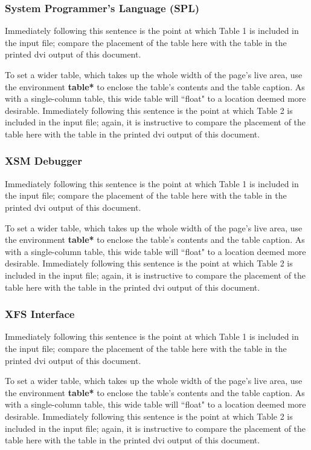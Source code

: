 \documentclass{sig-alternate}
\begin{document}
\subsubsection{System Programmer's Language (SPL)}
Immediately following this sentence is the point at which
Table 1 is included in the input file; compare the
placement of the table here with the table in the printed
dvi output of this document.

To set a wider table, which takes up the whole width of
the page's live area, use the environment
\textbf{table*} to enclose the table's contents and
the table caption.  As with a single-column table, this wide
table will ``float" to a location deemed more desirable.
Immediately following this sentence is the point at which
Table 2 is included in the input file; again, it is
instructive to compare the placement of the
table here with the table in the printed dvi
output of this document.

\subsubsection{XSM Debugger}
Immediately following this sentence is the point at which
Table 1 is included in the input file; compare the
placement of the table here with the table in the printed
dvi output of this document.

To set a wider table, which takes up the whole width of
the page's live area, use the environment
\textbf{table*} to enclose the table's contents and
the table caption.  As with a single-column table, this wide
table will ``float" to a location deemed more desirable.
Immediately following this sentence is the point at which
Table 2 is included in the input file; again, it is
instructive to compare the placement of the
table here with the table in the printed dvi
output of this document.

\subsubsection{XFS Interface}
Immediately following this sentence is the point at which
Table 1 is included in the input file; compare the
placement of the table here with the table in the printed
dvi output of this document.

To set a wider table, which takes up the whole width of
the page's live area, use the environment
\textbf{table*} to enclose the table's contents and
the table caption.  As with a single-column table, this wide
table will ``float" to a location deemed more desirable.
Immediately following this sentence is the point at which
Table 2 is included in the input file; again, it is
instructive to compare the placement of the
table here with the table in the printed dvi
output of this document.
\end{document}
